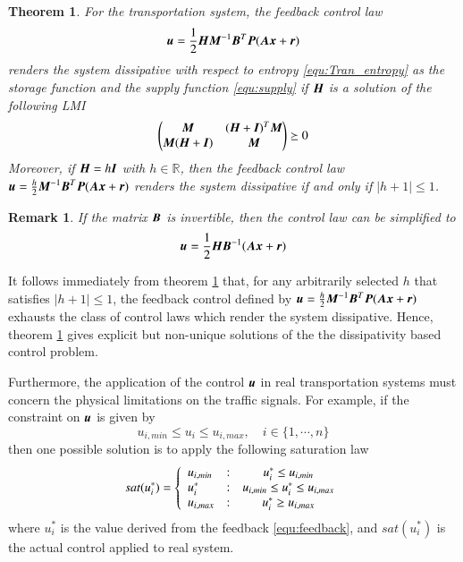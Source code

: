 \documentclass[preprint,authoryear,12pt]{elsarticle}
\renewcommand{\vec}[1]{\mbox{\boldmath$#1$}}
\newcommand{\mat}[1]{\mbox{\boldmath$#1$}}
\newtheorem{thm}{Theorem}
\newtheorem{rmk}{Remark}
\begin{document}
\begin{thm}\label{thm:pbc}
For the transportation system, the feedback control law
\begin{equation}
\label{equ:feedback}
\vec{u}=\frac{1}{2}\mat{H}\mat{M}^{-1}\mat{B}^T\mat{P}(\mat{A}
\vec{x}+\vec{r})
\end{equation}
renders the system dissipative with respect to
entropy \eqref{equ:Tran_entropy} as the storage function and the
supply function \eqref{equ:supply} if $\mat{H}$ is a solution of the
following LMI
$$\begin{pmatrix}
\mat{M}& (\mat{H}+\mat{I})^T \mat{M} \\
\mat{M} (\mat{H}+\mat{I})  & \mat{M}
\end{pmatrix}\succeq 0$$
Moreover, if $\mat{H}=h\mat{I}$ with $h\in \mathbb{R}$, then the
feedback control law $\vec{u}=\frac{h}{2} \mat{M}^{-1}\mat{B}^T
\mat{P} (\mat{A}\vec{x}+\vec{r})$ renders the system dissipative if
and only if $|h+1|\leq 1$.
\end{thm}

\begin{rmk}
If the matrix $\mat{B}$ is invertible, then the control law can be
simplified to
\begin{equation}
\vec{u}=\frac{1}{2}\mat{H}\mat{B}^{-1}(\mat{A}\vec{x}+\vec{r})
\end{equation}
\end{rmk}

It follows immediately from theorem \ref{thm:pbc} that, for any
arbitrarily selected $h$ that satisfies $|h+1|\leq 1$, the feedback
control defined by $\vec{u}=\frac{h}{2} \mat{M}^{-1}\mat{B}^T \mat{P}
(\mat{A}\vec{x}+\vec{r})$ exhausts the class of control laws
which render the system dissipative. Hence, theorem \ref{thm:pbc} 
gives explicit but non-unique solutions of the the dissipativity based
control problem.

Furthermore, the application of the control $\vec{u}$ in real
transportation systems must concern the physical limitations on the
traffic signals. For example, if the constraint on $\vec{u}$ is given
by
$$u_{i,min}\le u_i\le u_{i,max},\quad i\in\{1,\cdots,n\}
$$
then one possible solution is to apply the following saturation law
\begin{equation}
sat(u_i^*) = \left\{ \begin{array}{l@{\quad:\quad}c}
        u_{i,min} & u_i^*\le u_{i,min}\\
        u_i^* & u_{i,min}\le u_i^*\le u_{i,max}\\
        u_{i,max} & u_i^*\ge u_{i,max}
        \end{array}\right.
\end{equation}
where $u_i^*$ is the value derived from the feedback
\eqref{equ:feedback}, and $sat(u_i^*)$ is the actual control applied
to
real system.
\end{document}
